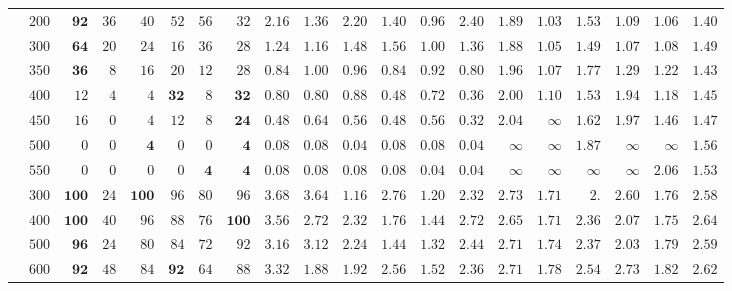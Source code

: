 \begin{table}[t!]
\begin{tabular}{c|c|rrrrrr|rrrrrr|rrrrrr}
& $200$ & $\mathbf{92}$ & $36$ & $40$ & $52$ & $56$ & $32$ & $2.16$ & $1.36$ & $2.20$ & $1.40$ & $\mathbf{0.96}$ & $2.40$ & $1.89$ & $\mathbf{1.03}$ & $1.53$ & $1.09$ & $1.06$ & $1.40$ \\
& $300$ & $\mathbf{64}$ & $20$ & $24$ & $16$ & $36$ & $28$ & $1.24$ & $1.16$ & $1.48$ & $1.56$ & $\mathbf{1.00}$ & $1.36$ & $1.88$ & $\mathbf{1.05}$ & $1.49$ & $1.07$ & $1.08$ & $1.49$ \\
& $350$ & $\mathbf{36}$ & $8$ & $16$ & $20$ & $12$ & $28$ & $0.84$ & $1.00$ & $0.96$ & $0.84$ & $0.92$ & $\mathbf{0.80}$ & $1.96$ & $\mathbf{1.07}$ & $1.77$ & $1.29$ & $1.22$ & $1.43$ \\
& $400$ & $12$ & $4$ & $4$ & $\mathbf{32}$ & $8$ & $\mathbf{32}$ & $0.80$ & $0.80$ & $0.88$ & $0.48$ & $0.72$ & $\mathbf{0.36}$ & $2.00$ & $\mathbf{1.10}$ & $1.53$ & $1.94$ & $1.18$ & $1.45$ \\
& $450$ & $16$ & $0$ & $4$ & $12$ & $8$ & $\mathbf{24}$ & $0.48$ & $0.64$ & $0.56$ & $0.48$ & $0.56$ & $\mathbf{0.32}$ & $2.04$ & $\infty$ & $1.62$ & $1.97$ & $\mathbf{1.46}$ & $1.47$ \\
& $500$ & $0$ & $0$ & $\mathbf{4}$ & $0$ & $0$ & $\mathbf{4}$ & $0.08$ & $0.08$ & $\mathbf{0.04}$ & $0.08$ & $0.08$ & $\mathbf{0.04}$ & $\infty$ & $\infty$ & $1.87$ & $\infty$ & $\infty$ & $\mathbf{1.56}$ \\
& $550$ & $0$ & $0$ & $0$ & $0$ & $\mathbf{4}$ & $\mathbf{4}$ & $0.08$ & $0.08$ & $0.08$ & $0.08$ & $\mathbf{0.04}$ & $\mathbf{0.04}$ & $\infty$ & $\infty$ & $\infty$ & $\infty$ & $2.06$ & $\mathbf{1.53}$ \\
\midrule
\parbox[t]{2mm}{}
& $300$ & $\mathbf{100}$ & $24$ & $\mathbf{100}$ & $96$ & $80$ & $96$ & $3.68$ & $3.64$ & $\mathbf{1.16}$ & $2.76$ & $1.20$ & $2.32$ & $2.73$ & $\mathbf{1.71}$ & $2.$ & $2.60$ & $1.76$ & $2.58$ \\
& $400$ & $\mathbf{100}$ & $40$ & $96$ & $88$ & $76$ & $\mathbf{100}$ & $3.56$ & $2.72$ & $2.32$ & $1.76$ & $\mathbf{1.44}$ & $2.72$ & $2.65$ & $\mathbf{1.71}$ & $2.36$ & $2.07$ & $1.75$ & $2.64$ \\
& $500$ & $\mathbf{96}$ & $24$ & $80$ & $84$ & $72$ & $92$ & $3.16$ & $3.12$ & $2.24$ & $1.44$ & $\mathbf{1.32}$ & $2.44$ & $2.71$ & $\mathbf{1.74}$ & $2.37$ & $2.03$ & $1.79$ & $2.59$ \\
& $600$ & $\mathbf{92}$ & $48$ & $84$ & $\mathbf{92}$ & $64$ & $88$ & $3.32$ & $1.88$ & $1.92$ & $2.56$ & $\mathbf{1.52}$ & $2.36$ & $2.71$ & $\mathbf{1.78}$ & $2.54$ & $2.73$ & $1.82$ & $2.62$ \\

\end{tabular}
\end{table}
